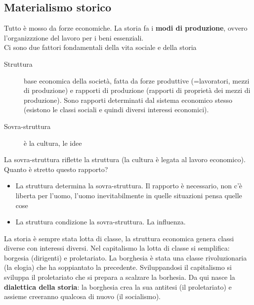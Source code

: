 \subsection{Materialismo storico}
Tutto è mosso da forze economiche. La storia fa i \textbf{modi di produzione}, ovvero l'organizzzione
del lavoro per i beni essenziali.\\
Ci sono due fattori fondamentali della vita sociale e della storia
\begin{description}
  \item[Struttura] base economica della società, fatta da forze produttive (=lavoratori, mezzi di
    produzione) e rapporti di produzione (rapporti di proprietà dei mezzi di produzione). Sono
    rapporti determinati dal sistema economico stesso (esistono le classi sociali e quindi diversi
    interessi economici).
  \item[Sovra-struttura] è la cultura, le idee
\end{description}
La sovra-struttura riflette la struttura (la cultura è legata al lavoro economico). Quanto è stretto
questo rapporto?
\begin{itemize}
  \item La struttura determina la sovra-struttura. Il rapporto è necessario, non c'è liberta per
    l'uomo, l'uomo inevitabilmente in quelle situazioni pensa quelle cose
  \item La struttura condizione la sovra-struttura. La influenza.
\end{itemize}
La storia è sempre stata lotta di classe, la struttura economica genera classi diverse con interessi
diversi. Nel capitalismo la lotta di classe si semplifica: borgesia (dirigenti) e proletariato.
La borghesia è stata una classe rivoluzionaria (la elogia) che ha soppiantato la precedente.
Sviluppandosi il capitalismo si sviluppa il proletariato che si prepara a scalzare la borhesia. Da
qui nasce la \textbf{dialettica della storia}: la borghesia crea la sua antitesi (il proletariato)
e assieme creeranno qualcosa di nuovo (il socialismo).

